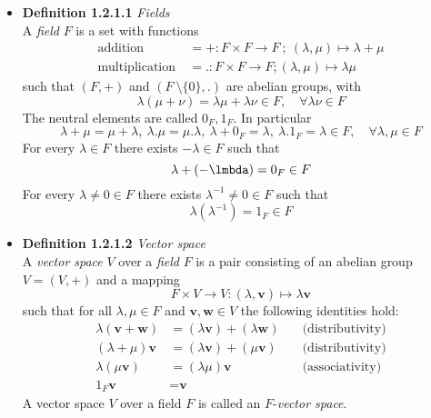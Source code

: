 \documentclass[11pt,a4paper]{article}
\begin{document}
\begin{itemize}

    \item \textbf{Definition 1.2.1.1} \emph{Fields} \\
        A \emph{field} $F$ is a set with functions
        \begin{align*}{}
            \text{addition} \  &= + : F \times F \to F \ ;
            \ (\lambda, \mu) \mapsto \lambda + \mu \\
            \text{multiplication} \ &=. : F \times F \to F ; (\lambda, \mu) \mapsto \lambda\mu
        \end{align*}
        such that $(F, +)$ and $(F \ \setminus \{0\},.)$ are abelian groups, with
        \[
            \lambda (\mu + \nu) = \lambda \mu + \lambda \nu \in F, \quad
            \forall \lambda \nu \in F
        \]
        The neutral elements are called $0_F, 1_F$.
        In particular
        \[
            \lambda + \mu = \mu + \lambda ,\
            \lambda. \mu  = \mu. \lambda ,\
            \lambda + 0_F = \lambda ,\
            \lambda. 1_F  = \lambda \in F, \quad
            \forall \lambda, \mu \in F
        \]
        For every $\lambda \in F$ there exists $-\lambda \in F$ such that
        \[
            \lambda + (-\lmbda) = 0_F \in F
        \]
        For every $\lambda \neq 0 \in F$ there exists $\lambda^{-1} \neq 0 \in F$ such that
        \[
            \lambda(\lambda^{-1}) = 1_F \in F
        \]

    \item \textbf{Definition 1.2.1.2} \emph{Vector space} \\
        A \emph{vector space} $V$ over a \emph{field} $F$
        is a pair consisting of an abelian group $V = (V,+)$ and a mapping
        \[
            F \times V \to V : (\lambda, \textbf{v}) \mapsto \lambda \textbf{v}
        \]
        such that for all $\lambda, \mu \in F$ and $\textbf{v}, \textbf{w} \in V$
        the following identities hold:
        \begin{align*}{}
            \lambda(\textbf{v} + \textbf{w}) & = (\lambda \textbf{v}) + (\lambda \textbf{w})
            \quad                            & \text{(distributivity)} \\
            (\lambda + \mu) \textbf{v}       & = (\lambda \textbf{v}) + (\mu \textbf{v})
            \quad                            & \text{(distributivity)} \\
            \lambda(\mu \textbf{v})          & = (\lambda \mu) \textbf{v}
            \quad                            & \text{(associativity)} \\
            1_F\textbf{v}                    & = \textbf{v}
        \end{align*}
        A vector space $V$ over a field $F$ is called an $F$-\emph{vector space}.


\end{itemize}
\end{document}
